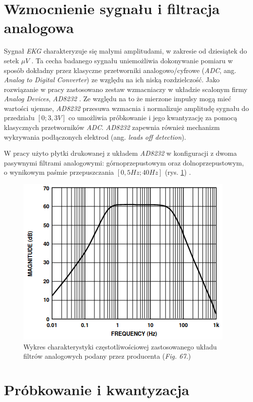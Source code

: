 \newpage

\section{Wzmocnienie sygnału i filtracja analogowa}

Sygnał \textit{EKG} charakteryzuje się małymi amplitudami, w zakresie od dziesiątek do setek $\mu V$ \cite{Zywietz1990}.
Ta cecha badanego sygnału uniemożliwia dokonywanie pomiaru w sposób dokładny przez klasyczne przetworniki analogowo/cyfrowe (\textit{ADC}, ang. \textit{Analog to Digital Converter})
ze względu na ich niską rozdzielczość. Jako rozwiązanie w pracy zastosowano zestaw wzmacniaczy w układzie scalonym firmy \textit{Analog Devices}, \textit{AD8232} \cite{AD8232ds}. 
Ze względu na to że mierzone impulsy mogą mieć wartości ujemne, \textit{AD8232} przesuwa wzmacnia i normalizuje amplitudę sygnału do przedziału $[0; 3,3V]$ co umożliwia 
próbkowanie i jego kwantyzację za pomocą klasycznych przetworników \textit{ADC}. 
\textit{AD8232} zapewnia również mechanizm wykrywania podłączonych elektrod (ang. \textit{leads off detection}).


W pracy użyto płytki drukowanej z układem \textit{AD8232} \cite{AD8232BS} w konfiguracji z dwoma pasywnymi filtrami analogowymi: 
górnoprzepustowym oraz dolnoprzepustowym, o wynikowym paśmie przepuszczania $[0,5 Hz; 40Hz]$ (rys. \ref{fig:afilt}) \cite{AD8232ds}.

\begin{figure}[h!]
    \centering 
    \includegraphics[scale=0.75]{pl/media/afilt.png}
    \caption{Wykres charakterystyki częstotliwościowej zastosowanego układu filtrów analogowych podany przez producenta \cite{AD8232ds}(\textit{Fig. 67.})}
    \label{fig:afilt}
\end{figure}

\newpage

\section{Próbkowanie i kwantyzacja}

